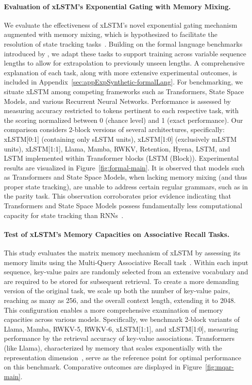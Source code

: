 \paragraph{Evaluation of xLSTM's Exponential Gating with Memory Mixing.} We evaluate the effectiveness of xLSTM's novel exponential gating mechanism augmented with memory mixing, which is hypothesized to facilitate the resolution of state tracking tasks~\citep{Merrill:24, Merrill:23}. Building on the formal language benchmarks introduced by \citet{Deletang:23}, we adapt these tasks to support training across variable sequence lengths to allow for extrapolation to previously unseen lengths. A comprehensive explanation of each task, along with more extensive experimental outcomes, is included in Appendix~\ref{sec:appExpSynthetic-formalLang}. For benchmarking, we situate xLSTM among competing frameworks such as Transformers, State Space Models, and various Recurrent Neural Networks. Performance is assessed by measuring accuracy restricted to tokens pertinent to each respective task, with the scoring normalized between 0 (chance level) and 1 (exact performance). Our comparison considers 2-block versions of several architectures, specifically: xLSTM[0:1] (containing only sLSTM units), xLSTM[1:0] (exclusively mLSTM units), xLSTM[1:1], Llama, Mamba, RWKV, Retention, Hyena, LSTM, and LSTM implemented within Transformer blocks (LSTM (Block)). Experimental results are visualized in Figure~\ref{fig:formal-main}. It is observed that models such as Transformers and State Space Models, when lacking memory mixing (and thus proper state tracking), are unable to address certain regular grammars, such as in the parity task. This observation corroborates prior evidence indicating that Transformers and State Space Models possess fundamentally less computational capacity for state tracking than RNNs~\citep{Merrill:24, Merrill:23, Deletang:23}.

\paragraph{Test of xLSTM's Memory Capacities on Associative Recall Tasks.} This study evaluates the matrix memory mechanism of xLSTM by assessing its memory limits using the Multi-Query Associative Recall task~\citep{Arora:23arxiv}. Within each input sequence, key-value pairs are randomly selected from an extensive vocabulary and are required to be stored for subsequent retrieval. To create a more demanding version of the original task, we scale up both the number of key-value pairs, reaching as many as 256, and the overall context length, extending it to 2048. This configuration enables a more comprehensive examination of memory capacities across various models. Specifically, we benchmark 2-block variants of Llama, Mamba, RWKV-5, RWKV-6, xLSTM[1:1], and xLSTM[1:0], measuring performance by the retrieval accuracy of key-value associations. Transformers (like Llama), characterized by memory that scales exponentially with the representation dimension~\citep{Ramsauer:21}, serve as the reference point for optimal performance on this benchmark. Comparative outcomes are displayed in Figure~\ref{fig:mqar-main}.

